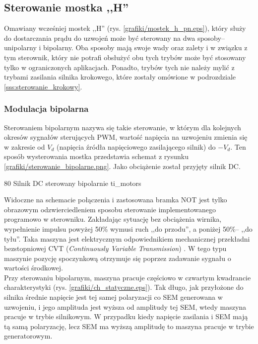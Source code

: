 \subsection{Sterowanie mostka ,,H''}

Omawiany wcześniej mostek ,,H'' (rys. \ref{grafiki/mostek_h_pn.eps}), który służy do dostarczania prądu do uzwojeń może być sterowany na dwa sposoby-- unipolarny i bipolarny. Oba sposoby mają swoje wady oraz zalety i w związku z tym sterownik, który nie potrafi obsłużyć obu tych trybów może być stosowany tylko w ograniczonych aplikacjach. Ponadto, trybów tych nie należy mylić z trybami zasilania silnika krokowego, które zostały omówione w podrozdziale \ref{sss:sterowanie_krokowy}.

\subsubsection{Modulacja bipolarna}

Sterowaniem bipolarnym nazywa się takie sterowanie, w którym dla kolejnych okresów sygnałów sterujących PWM, wartość napięcia na uzwojeniu zmienia się w zakresie od $ V_d $ (napięcia źródła napięciowego zasilającego silnik) do $ -V_d $. Ten sposób wysterowania mostka przedstawia schemat z rysunku \ref{grafiki/sterowanie_bipolarne.png}. Jako obciążenie został przyjęty silnik DC.

	{80}
	{Silnik DC sterowany bipolarnie}
	{ti_motors}
	
Widoczne na schemacie połączenia i zastosowana bramka NOT jest tylko obrazowym odzwierciedleniem sposobu sterowanie implementowanego programowo w sterowniku. Zakładając sytuację bez obciążenia wirnika, wypełnienie impulsu powyżej 50\% wymusi ruch ,,do przodu'', a poniżej 50\%-- ,,do tyłu''. Taka maszyna jest elektrycznym odpowiednikiem mechanicznej przekładni bezstopniowej CVT ({\it Continuously Variable Transmission}) \cite{ti_motors}. W tego typu maszynie pozycję spoczynkową otrzymuje się poprzez zadawanie sygnału o wartości środkowej. \\

Przy sterowaniu bipolarnym, maszyna pracuje częściowo w czwartym kwadrancie charakterystyki (rys. \ref{grafiki/ch_statyczne.eps}). Tak długo, jak przyłożone do silnika średnie napięcie jest tej samej polaryzacji co SEM generowana w uzwojeniu, i jego amplituda jest wyższa od amplitudy tej SEM, wtedy maszyna pracuje w trybie silnikowym. W przypadku kiedy napięcie zasilania i SEM mają tą samą polaryzację, lecz SEM ma wyższą amplitudę to maszyna pracuje w trybie generatorowym. 

